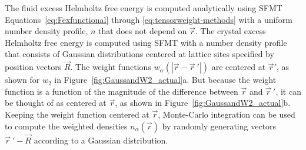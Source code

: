 \documentclass[double,12pt]{beavtex}
\begin{document}
The fluid excess Helmholtz free energy is computed analytically  
using SFMT Equations~\ref{eq:Fexfunctional} through \ref{eq:tensorweight-methods} 
with a uniform number density profile, $n$ that does not depend on $\vec r$. 
The crystal excess Helmholtz free energy is computed  
using SFMT with a number density profile 
that consists of Gaussian distributions 
centered at lattice sites specified by position vectors $\vec R$. 
The weight functions $w_\alpha(|\vec r - \vec r~'|)$ are centered at $\vec r'$,
as shown for $w_2$ in Figure~\ref{fig:GaussandW2_actual}a. 
But because the weight function is a function of the magnitude of the 
difference between $\vec r$ and $\vec r~'$, it can be thought of as 
centered at $\vec r$, as shown in Figure~\ref{fig:GaussandW2_actual}b.
Keeping the weight function centered at $\vec r$, 
Monte-Carlo integration can be used to compute the weighted densities $n_\alpha(\vec r)$
by randomly generating vectors
$\vec r~' -\vec R$ according to a Gaussian distribution.
%
\end{document}
